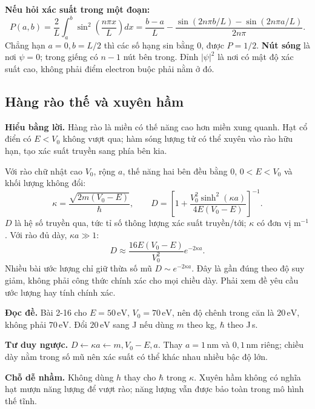 \documentclass[11pt,a4paper]{article}
\newcommand{\unit}[1]{\,\mathrm{#1}}
\newcommand{\idea}[1]{\par\textbf{Hiểu bằng lời.} #1\par}
\newcommand{\readit}[1]{\par\textbf{Đọc đề.} #1\par}
\newcommand{\think}[1]{\par\textbf{Tư duy ngược.} #1\par}
\newcommand{\trap}[1]{\par\textbf{Chỗ dễ nhầm.} #1\par}
\begin{document}
\textbf{Nếu hỏi xác suất trong một đoạn:}
\[
P(a,b)=\frac2L\int_a^b\sin^2\left(\frac{n\pi x}{L}\right)dx
=\frac{b-a}{L}
-\frac{\sin(2n\pi b/L)-\sin(2n\pi a/L)}{2n\pi}.
\]
Chẳng hạn $a=0,b=L/2$ thì các số hạng sin bằng 0, được $P=1/2$.
\textbf{Nút sóng} là nơi $\psi=0$; trong giếng có $n-1$ nút bên trong.
Đỉnh $|\psi|^2$ là nơi có mật độ xác suất cao, không phải điểm electron
buộc phải nằm ở đó.

\subsection{Hàng rào thế và xuyên hầm}\label{sec:tunnel}
\idea{Hàng rào là miền có thế năng cao hơn miền xung quanh.
Hạt cổ điển có $E<V_0$ không vượt qua; hàm sóng lượng tử có thể xuyên vào
rào hữu hạn, tạo xác suất truyền sang phía bên kia.}
Với rào chữ nhật cao $V_0$, rộng $a$, thế năng hai bên đều bằng 0,
$0<E<V_0$ và khối lượng không đổi:
\[
\kappa=\frac{\sqrt{2m(V_0-E)}}\hbar,\qquad
D=\left[1+\frac{V_0^2\sinh^2(\kappa a)}{4E(V_0-E)}\right]^{-1}.
\]
$D$ là hệ số truyền qua, tức tỉ số thông lượng xác suất truyền/tới;
$\kappa$ có đơn vị m$^{-1}$. Với rào đủ dày, $\kappa a\gg1$:
\[
D\approx\frac{16E(V_0-E)}{V_0^2}e^{-2\kappa a}.
\]
Nhiều bài ước lượng chỉ giữ thừa số mũ $D\sim e^{-2\kappa a}$.
Đây là gần đúng theo độ suy giảm, không phải công thức chính xác
cho mọi chiều dày. Phải xem đề yêu cầu ước lượng hay tính chính xác.

\begin{center}
\end{center}

\readit{Bài 2-16 cho $E=50\unit{eV}$, $V_0=70\unit{eV}$,
nên độ chênh trong căn là $20\unit{eV}$, không phải $70\unit{eV}$.
Đổi $20\unit{eV}$ sang J nếu dùng $m$ theo kg, $\hbar$ theo J\,s.}
\think{$D\leftarrow\kappa a\leftarrow m,V_0-E,a$.
Thay $a=1\unit{nm}$ và $0{,}1\unit{nm}$ riêng; chiều dày nằm trong số mũ
nên xác suất có thể khác nhau nhiều bậc độ lớn.}
\trap{Không dùng $h$ thay cho $\hbar$ trong $\kappa$.
Xuyên hầm không có nghĩa hạt mượn năng lượng để vượt rào;
năng lượng vẫn được bảo toàn trong mô hình thế tĩnh.}
\end{document}
